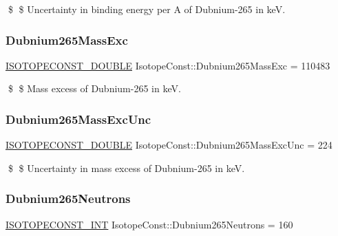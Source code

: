 \$ \$ Uncertainty in binding energy per A of Dubnium-\/265 in keV. \mbox{\label{group___isotope_const-_dubnium-_db265_gae2272899951f09e60c396f8f53de71a2}} 
\subsubsection{\texorpdfstring{Dubnium265\+Mass\+Exc}{Dubnium265MassExc}}
{\footnotesize\ttfamily \mbox{\hyperlink{group___isotope_const-_macros_ga8f45a7272ce02c0b4c65c44636ed719a}{I\+S\+O\+T\+O\+P\+E\+C\+O\+N\+S\+T\+\_\+\+D\+O\+U\+B\+LE}} Isotope\+Const\+::\+Dubnium265\+Mass\+Exc = 110483}

\$ \$ Mass excess of Dubnium-\/265 in keV. \mbox{\label{group___isotope_const-_dubnium-_db265_gaf04cd96d77821c8dd73e5bfbe9ad55db}} 
\subsubsection{\texorpdfstring{Dubnium265\+Mass\+Exc\+Unc}{Dubnium265MassExcUnc}}
{\footnotesize\ttfamily \mbox{\hyperlink{group___isotope_const-_macros_ga8f45a7272ce02c0b4c65c44636ed719a}{I\+S\+O\+T\+O\+P\+E\+C\+O\+N\+S\+T\+\_\+\+D\+O\+U\+B\+LE}} Isotope\+Const\+::\+Dubnium265\+Mass\+Exc\+Unc = 224}

\$ \$ Uncertainty in mass excess of Dubnium-\/265 in keV. \mbox{\label{group___isotope_const-_dubnium-_db265_gab8cb20af5e63617afa46b0c773255ffc}} 
\subsubsection{\texorpdfstring{Dubnium265\+Neutrons}{Dubnium265Neutrons}}
{\footnotesize\ttfamily \mbox{\hyperlink{group___isotope_const-_macros_ga5f18360b3e99483a35c32d789e62621c}{I\+S\+O\+T\+O\+P\+E\+C\+O\+N\+S\+T\+\_\+\+I\+NT}} Isotope\+Const\+::\+Dubnium265\+Neutrons = 160}

